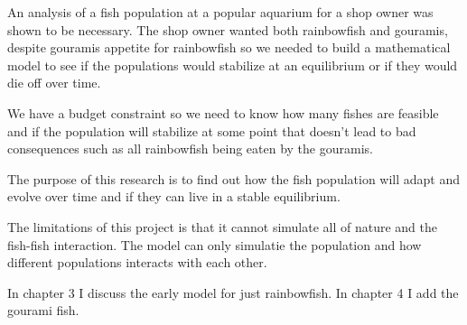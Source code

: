 \begin{flushleft}
    An analysis of a fish population at a popular aquarium for a shop owner was
    shown to be necessary. The shop owner wanted both rainbowfish and
    gouramis, despite gouramis appetite for rainbowfish so we
    needed to build a mathematical model to see if the populations
    would stabilize at an equilibrium or if they would die off over time.

\end{flushleft}

\begin{flushleft}
    We have a budget constraint so we need to know how many fishes are feasible and if the population will stabilize at some point that doesn't
    lead to bad consequences such as all rainbowfish being eaten by the gouramis.

\end{flushleft}

\begin{flushleft}
    The purpose of this research is to find out how the fish population will adapt and evolve over time
    and if they can live in a stable equilibrium.
\end{flushleft}

\begin{flushleft}
    The limitations of this project is that it cannot simulate all of nature and the fish-fish interaction. The model can only simulatie the population and how different populations
    interacts with each other.
\end{flushleft}

\begin{flushleft}
    In chapter 3 I discuss the early model for just rainbowfish. In
    chapter 4 I add the gourami fish.
\end{flushleft}